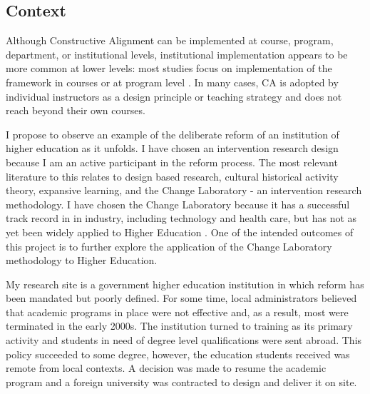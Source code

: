 \documentclass[a4paper,man,natbib]{apa6}
\begin{document}
\subsection{Context}
\label{sec:background}


Although Constructive Alignment can be implemented at course, program, department, or institutional levels, institutional implementation appears to be more common at lower levels: most studies focus on implementation of the framework in courses \citep{joseph2012using} or at program level  \citep{spelt2015constructively}. In many cases, CA is adopted by individual instructors as a design principle or teaching strategy \citep{masoumi2012quality} and does not reach beyond their own courses.

I propose to observe an example of the deliberate reform of an institution of higher education as it unfolds. I have chosen an intervention research design because I am an active participant in the reform process. The most relevant literature to this relates to design based research, cultural historical activity theory, expansive learning, and the Change Laboratory - an intervention research methodology. I have chosen the Change Laboratory because it has a successful track record in in industry, including technology and health care, but has not as yet been widely applied to Higher Education \citep{bligh2015change}. One of the intended outcomes of this project is to further explore the application of the Change Laboratory methodology to Higher Education.
\newline


My research site is a government higher education institution in which reform has been mandated but poorly defined. For some time, local administrators believed that academic programs in place were not effective and, as a result, most were terminated in the early 2000s. The institution turned to training as its primary activity and students in need of degree level qualifications were sent abroad. This policy succeeded to some degree, however, the education students received was remote from local contexts. A decision was made to resume the academic program and a foreign university was contracted to design and deliver it on site.
\end{document}

